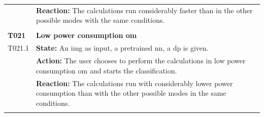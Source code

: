 \documentclass[parskip=full]{scrartcl}
\begin{document}
\begin{tabular}{p{2cm}p{11.4cm}}
& \textbf{Reaction:} The calculations run considerably faster than in the other possible modes with the same conditions.\\
& \\
\textbf{T021} \hypertarget{T021} & \textbf{Low \gls{power consumption} \gls{om}}\\
T021.1 & \textbf{State:} An \gls{img} as input, a pretrained \gls{nn}, a \gls{dp} is given.\\
& \textbf{Action:} The user chooses to perform the calculations in low \gls{power consumption} \gls{om} and starts the classification.\\
& \textbf{Reaction:} The calculations run with considerably lower \gls{power consumption} than with the other possible modes in the same conditions.\\
& \\
\end{tabular}
\newpage
\end{document}
